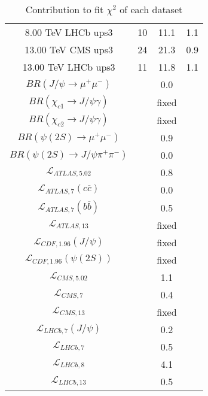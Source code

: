 \begin{table}[h!]
\begin{tabular}{c|c|c|c}
8.00 TeV LHCb ups3 & 10 & 11.1 & 1.1 \\
13.00 TeV CMS ups3 & 24 & 21.3 & 0.9 \\
13.00 TeV LHCb ups3 & 11 & 11.8 & 1.1 \\
\hline
$BR(J/\psi\rightarrow\mu^+\mu^-)$ &  & 0.0 &  \\
$BR(\chi_{c1}\rightarrow J/\psi\gamma)$ &  & fixed & \\
$BR(\chi_{c2}\rightarrow J/\psi\gamma)$ &  & fixed & \\
$BR(\psi(2S)\rightarrow\mu^+\mu^-)$ &  & 0.9 &  \\
$BR(\psi(2S)\rightarrow J/\psi\pi^+\pi^-)$ &  & 0.0 &  \\
$\mathcal L_{ATLAS,5.02}$ &  & 0.8 &  \\
$\mathcal L_{ATLAS,7}(c\overline c)$ &  & 0.0 &  \\
$\mathcal L_{ATLAS,7}(b\overline b)$ &  & 0.5 &  \\
$\mathcal L_{ATLAS,13}$ &  & fixed & \\
$\mathcal L_{CDF,1.96}(J/\psi)$ &  & fixed & \\
$\mathcal L_{CDF,1.96}(\psi(2S))$ &  & fixed & \\
$\mathcal L_{CMS,5.02}$ &  & 1.1 &  \\
$\mathcal L_{CMS,7}$ &  & 0.4 &  \\
$\mathcal L_{CMS,13}$ &  & fixed & \\
$\mathcal L_{LHCb,7}(J/\psi)$ &  & 0.2 &  \\
$\mathcal L_{LHCb,7}$ &  & 0.5 &  \\
$\mathcal L_{LHCb,8}$ &  & 4.1 &  \\
$\mathcal L_{LHCb,13}$ &  & 0.5 &  \\
\end{tabular}
\caption{Contribution to fit $\chi^2$ of each dataset}
\end{table}
